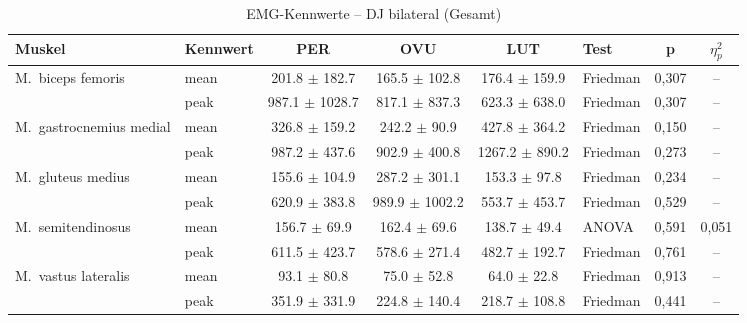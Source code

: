 \begin{table}[H]
  \centering
  \caption{EMG-Kennwerte – DJ bilateral (Gesamt)}
  \label{tab:DJ_bilateral_Gesamt}
  \small
  \begin{tabular}{l l c c c l c c}
    \hline
    \textbf{Muskel} & \textbf{Kennwert} & \textbf{PER} & \textbf{OVU} & \textbf{LUT} & \textbf{Test} & \textbf{p} & \textbf{$\eta^2_p$} \\
    \hline
    M.~biceps femoris & mean & 201.8 $\pm$ 182.7 & 165.5 $\pm$ 102.8 & 176.4 $\pm$ 159.9 & Friedman & 0{,}307 & -- \\
     & peak & 987.1 $\pm$ 1028.7 & 817.1 $\pm$ 837.3 & 623.3 $\pm$ 638.0 & Friedman & 0{,}307 & -- \\
    \hline
    M.~gastrocnemius medial & mean & 326.8 $\pm$ 159.2 & 242.2 $\pm$ 90.9 & 427.8 $\pm$ 364.2 & Friedman & 0{,}150 & -- \\
     & peak & 987.2 $\pm$ 437.6 & 902.9 $\pm$ 400.8 & 1267.2 $\pm$ 890.2 & Friedman & 0{,}273 & -- \\
    \hline
    M.~gluteus medius & mean & 155.6 $\pm$ 104.9 & 287.2 $\pm$ 301.1 & 153.3 $\pm$ 97.8 & Friedman & 0{,}234 & -- \\
     & peak & 620.9 $\pm$ 383.8 & 989.9 $\pm$ 1002.2 & 553.7 $\pm$ 453.7 & Friedman & 0{,}529 & -- \\
    \hline
    M.~semitendinosus & mean & 156.7 $\pm$ 69.9 & 162.4 $\pm$ 69.6 & 138.7 $\pm$ 49.4 & ANOVA & 0{,}591 & 0{,}051 \\
     & peak & 611.5 $\pm$ 423.7 & 578.6 $\pm$ 271.4 & 482.7 $\pm$ 192.7 & Friedman & 0{,}761 & -- \\
    \hline
    M.~vastus lateralis & mean & 93.1 $\pm$ 80.8 & 75.0 $\pm$ 52.8 & 64.0 $\pm$ 22.8 & Friedman & 0{,}913 & -- \\
     & peak & 351.9 $\pm$ 331.9 & 224.8 $\pm$ 140.4 & 218.7 $\pm$ 108.8 & Friedman & 0{,}441 & -- \\
    \hline
  \end{tabular}
\end{table}

